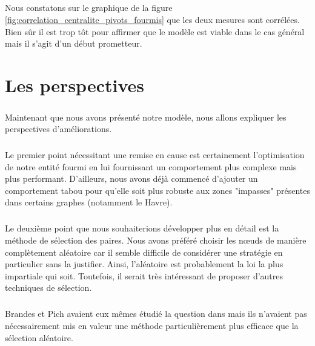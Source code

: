 \documentclass[a4paper, 10pt]{report}
\begin{document}
\paragraph{}Nous constatons sur le graphique de la figure \ref{fig:correlation_centralite_pivots_fourmis} que les deux mesures sont corrélées. Bien sûr il est trop tôt pour affirmer que le modèle est viable dans le cas général mais il s'agit d'un début prometteur.


\chapter{Les perspectives}

\paragraph{}Maintenant que nous avons présenté notre modèle, nous allons expliquer les perspectives d'améliorations.

\paragraph{}Le premier point nécessitant une remise en cause est certainement l'optimisation de notre entité fourmi en lui fournissant un comportement plus complexe mais plus performant. D'ailleurs, nous avons déjà commencé d'ajouter un comportement tabou pour qu'elle soit plus robuste aux zones "impasses" présentes dans certains graphes (notamment le Havre).

\paragraph{}Le deuxième point que nous souhaiterions développer plus en détail est la méthode de sélection des paires. Nous avons préféré choisir les n\oe uds de manière complètement aléatoire car il semble difficile de considérer une stratégie en particulier sans la justifier. Ainsi, l'aléatoire est probablement la loi la plus impartiale qui soit. Toutefois, il serait très intéressant de proposer d'autres techniques de sélection. 

\paragraph{}Brandes et Pich avaient eux mêmes étudié la question dans \cite{Brandes2007Centrality} mais ils n'avaient pas nécessairement mis en valeur une méthode particulièrement plus efficace que la sélection aléatoire. 
\end{document}
